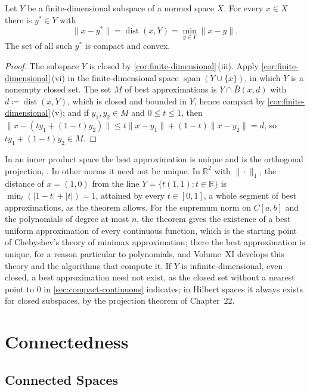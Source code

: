 \begin{theorem}
\label{thm:best-approximation-normed}
Let $Y$ be a finite-dimensional subspace of a normed space $X$. For every $x\in X$ there is $y^*\in Y$ with
\[
\|x-y^*\|=\operatorname{dist}(x,Y)=\min_{y\in Y}\|x-y\| .
\]
The set of all such $y^*$ is compact and convex.
\end{theorem}

\begin{proof}
The subspace $Y$ is closed by \cref{cor:finite-dimensional}\,(iii). Apply \cref{cor:finite-dimensional}\,(vi) in the finite-dimensional space $\operatorname{span}(Y\cup\{x\})$, in which $Y$ is a nonempty closed set. The set $M$ of best approximations is $Y\cap\bar B(x,d)$ with $d\coloneqq\operatorname{dist}(x,Y)$, which is closed and bounded in $Y$, hence compact by \cref{cor:finite-dimensional}\,(v); and if $y_1,y_2\in M$ and $0\le t\le1$, then $\|x-(ty_1+(1-t)y_2)\|\le t\|x-y_1\|+(1-t)\|x-y_2\|=d$, so $ty_1+(1-t)y_2\in M$.
\end{proof}

In an inner product space the best approximation is unique and is the orthogonal projection, . In other norms it need not be unique. In $\mathbb R^2$ with $\|\cdot\|_1$, the distance of $x=(1,0)$ from the line $Y=\{t(1,1): t\in\mathbb R\}$ is $\min_t(|1-t|+|t|)=1$, attained by every $t\in[0,1]$, a whole segment of best approximations, as the theorem allows. For the supremum norm on $C[a,b]$ and the polynomials of degree at most $n$, the theorem gives the existence of a best uniform approximation of every continuous function, which is the starting point of Chebyshev's theory of minimax approximation; there the best approximation is unique, for a reason particular to polynomials, and Volume~XI develops this theory and the algorithms that compute it. If $Y$ is infinite-dimensional, even closed, a best approximation need not exist, as the closed set without a nearest point to $0$ in \cref{sec:compact-continuous} indicates; in Hilbert spaces it always exists for closed subspaces, by the projection theorem of Chapter~22.

\section{Connectedness}
\label{sec:connectedness}

\subsection{Connected Spaces}


